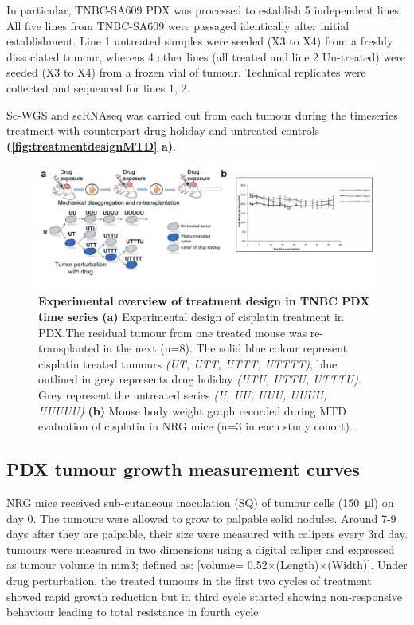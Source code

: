 In particular, TNBC-SA609 PDX was processed to establish 5 independent lines. All five lines from TNBC-SA609 were passaged identically after initial establishment. Line 1 untreated samples were seeded (X3 to X4) from a freshly dissociated tumour, whereas 4 other lines (all treated and line 2 Un-treated) were seeded (X3 to X4) from a frozen vial of tumour. Technical replicates were collected and sequenced for lines 1, 2. 

Sc-WGS and scRNAseq was carried out from each tumour during the timeseries treatment with counterpart drug holiday and untreated controls  \textbf{(\autoref{fig:treatmentdesignMTD} a)}.

\begin{figure}
\centering
\includegraphics[width=\textwidth]{Figures/chap2/treatmentdesignMTD.pdf}
	
\caption[Experimental overview of TNBC PDX treated time series]
	{\small
	\textbf{Experimental overview of treatment design in TNBC PDX time series}
\textbf{(a)} Experimental design of cisplatin treatment in PDX.The residual tumour from one treated mouse was re-transplanted in the next (n=8). The solid blue colour represent cisplatin treated tumours \textit{(UT, UTT, UTTT, UTTTT)}; blue outlined in grey represents drug holiday \textit{(UTU, UTTU, UTTTU)}. Grey represent the untreated series \textit{(U, UU, UUU, UUUU, UUUUU)} \textbf{(b)} Mouse body weight graph recorded during \ac{MTD} evaluation of cisplatin in NRG mice (n=3 in each study cohort).}
	
	\label{fig:treatmentdesignMTD}
\end{figure}


\subsection{PDX tumour growth measurement curves} 
NRG mice received sub-cutaneous inoculation (SQ) of tumour cells (\SI{150}{\ul}) on day 0. 
The tumours were allowed to grow to palpable solid nodules.
Around 7-9 days after they are palpable, their size were measured with calipers every 3rd day. 
tumours were measured in two dimensions using a digital caliper and expressed as tumour volume in mm3; defined as: [volume= 0.52$\times$(Length)$\times$(Width)].
Under drug perturbation, the treated tumours in the first two cycles of treatment showed rapid growth reduction but in third cycle started showing non-responsive behaviour leading to total resistance in fourth cycle 



